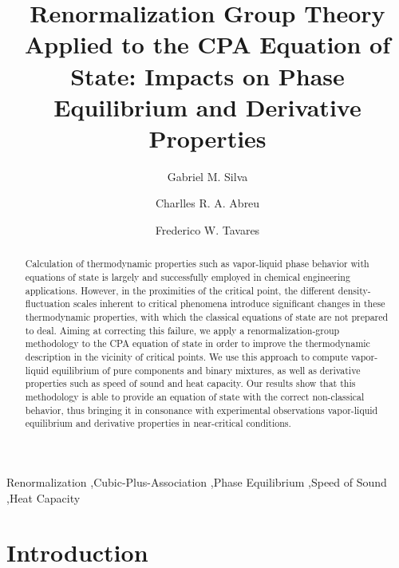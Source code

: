 \documentclass[preprint,12pt,3p]{elsarticle}
\date{\vspace{-5ex}}
\begin{document}
\begin{frontmatter}

\title{Renormalization Group Theory Applied to the CPA Equation of State: Impacts on Phase Equilibrium and Derivative Properties}


\author[1]{Gabriel M. Silva}
\author[1]{Charlles R. A. Abreu}
\author[1,2]{Frederico W. Tavares}
\address[1]{Escola de Qu\'imica, Universidade Federal do Rio de Janeiro, Rio de Janeiro C.P. 68542, Brazil}
\address[2]{Programa de Engenharia Qu\'imica – COPPE, Universidade Federal do Rio de Janeiro, Rio de Janeiro, C.P. 68542, Brazil}

\begin{abstract}
Calculation of thermodynamic properties such as vapor-liquid phase behavior with equations of state is largely and successfully employed in chemical engineering applications.
However, in the proximities of the critical point, the different density-fluctuation scales inherent to critical phenomena introduce significant changes in these thermodynamic properties, with which the classical equations of state are not prepared to deal.
Aiming at correcting this failure, we apply a renormalization-group methodology to the CPA equation of state in order to improve the thermodynamic description in the vicinity of critical points.
We use this approach to compute vapor-liquid equilibrium of pure components and binary mixtures, as well as derivative properties such as speed of sound and heat capacity.
Our results show that this methodology is able to provide an equation of state with the correct non-classical behavior, thus bringing it in consonance with experimental observations vapor-liquid equilibrium and derivative properties in near-critical conditions.
\end{abstract}

\begin{keyword}
Renormalization \sep Cubic-Plus-Association \sep Phase Equilibrium \sep Speed of Sound \sep Heat Capacity
\end{keyword}

\end{frontmatter}

\linenumbers

\renewcommand{\thesection}{\arabic{section}}
\section{Introduction}
\end{document}
